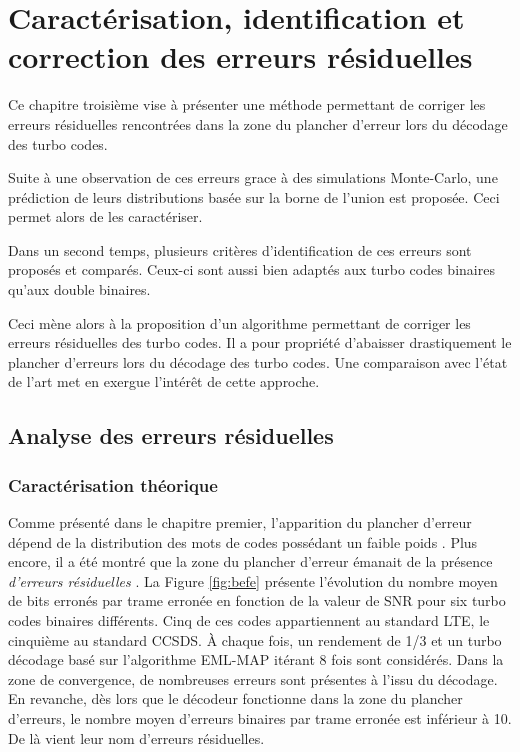 \chapter{Caractérisation, identification et correction des erreurs résiduelles} %
Ce chapitre troisième vise à présenter une méthode permettant de corriger les erreurs résiduelles rencontrées dans la zone
du plancher d'erreur lors du décodage des turbo codes.

Suite à une observation de ces erreurs grace à des simulations Monte-Carlo, une prédiction de leurs distributions basée sur la borne de l'union est proposée. 
Ceci permet alors de les caractériser.

Dans un second temps, plusieurs critères d'identification de ces erreurs sont proposés et comparés. Ceux-ci 
sont aussi bien adaptés aux turbo codes binaires qu'aux double binaires.

Ceci mène alors à la proposition d'un algorithme permettant de corriger les erreurs résiduelles des turbo codes.
Il a pour propriété d'abaisser drastiquement le plancher d'erreurs lors du décodage des turbo codes.
Une comparaison avec l'état de l'art met en exergue l’intérêt de cette approche.


\vspace*{\fill}
\minitocTITI
\vspace*{\fill}
\newpage

\section{Analyse des erreurs résiduelles}
\subsection{Caractérisation théorique}
Comme présenté dans le chapitre premier, l'apparition du plancher d'erreur dépend de la distribution des mots de codes 
possédant un faible poids \cite{distance_spectrum}. Plus encore, il a été montré que la zone du plancher d'erreur émanait 
de la présence \emph{d'erreurs résiduelles} \cite{takeshitaBCH}. 
La Figure \ref{fig:befe} présente l'évolution du nombre moyen de bits erronés par trame erronée en fonction de la valeur de 
SNR pour six turbo codes binaires différents. Cinq de ces codes appartiennent au standard LTE, le cinquième au standard CCSDS. 
À chaque fois, un rendement de 1/3 et un turbo décodage basé sur l'algorithme EML-MAP itérant 8 fois sont considérés. Dans la zone de 
convergence, de nombreuses erreurs sont présentes  à l'issu du décodage. En revanche, dès lors que le décodeur 
fonctionne dans la zone du plancher d'erreurs, le nombre moyen d'erreurs binaires par trame erronée est inférieur à 10. 
De là vient leur nom d'erreurs résiduelles.

